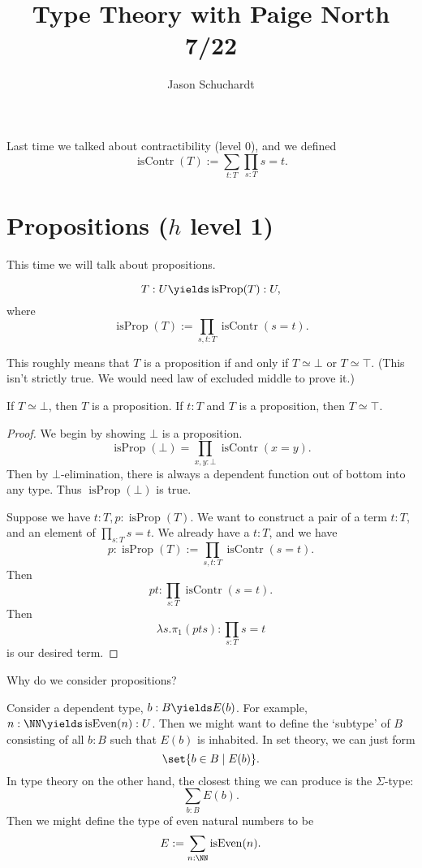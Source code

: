 \documentclass{article}
\title{Type Theory with Paige North 7/22}
\author{Jason Schuchardt}
\newcommand\pred[1]{\operatorname{#1}}
\newcommand\isContr{\pred{isContr}}
\newcommand\isProp{\pred{isProp}}
\begin{document}
\maketitle


Last time we talked about contractibility (level 0), and 
we defined 
\[ \isContr(T):= \sum_{t:T} \prod_{s:T} s=t. \]

\section{Propositions ($h$ level 1)}

This time we will talk about propositions.
\begin{definition}
    \[T:U\yields \isProp(T):U, \]
    where 
    \[ \isProp(T) := \prod_{s,t:T} \isContr(s=t).\]
\end{definition}

This roughly means that $T$ is a proposition if and only if 
$T\simeq \bot $ or $T\simeq \top$. (This isn't strictly true. We 
would need law of excluded middle to prove it.)

\begin{proposition}
    If $T\simeq \bot$, then $T$ is a proposition.
    If $t:T $ and $T$ is a proposition, then $T\simeq \top$.
\end{proposition}

\begin{proof}
    We begin by showing $\bot$ is a proposition.
    \[\isProp(\bot) = \prod_{x,y:\bot} \isContr(x=y).\]
    Then by $\bot$-elimination, there is always a dependent function 
    out of bottom into any type. Thus $\isProp(\bot)$ is true.

    Suppose we have $t:T,p:\isProp(T)$.
    We want to construct a pair of a term $t:T$,
    and an element of $\prod_{s:T} s=t$. We already have a 
    $t:T$, and we have 
    \[ p:\isProp(T) :=\prod_{s,t:T} \isContr(s=t). \]
    Then \[ pt : \prod_{s:T} \isContr(s=t).\] Then 
    \[ \lambda s. \pi_1(pts) : \prod_{s:T}s=t \]
    is our desired term.
\end{proof}

Why do we consider propositions?

Consider a dependent type, $b:B\yields E(b)$. For example,
$n:\NN\yields \pred{isEven}(n):U$. Then we might want to define 
the `subtype' of $B$ consisting of all $b:B$ such 
that $E(b)$ is inhabited. 
In set theory, we can just form 
\[\set{b\in B \mid E(b) }.\]
In type theory on the other hand, the closest thing we can 
produce is the $\Sigma$-type:
\[\sum_{b:B} E(b). \]
Then we might define the type of even natural numbers to be 
\[E:= \sum_{n:\NN} \pred{isEven}(n).\]
\end{document}
